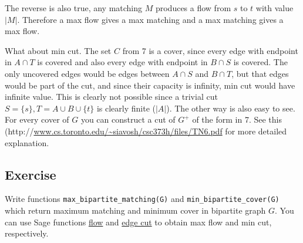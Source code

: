 The reverse is also true, any matching $M$ produces a flow from $s$ to $t$ with value $|M|$. Therefore a max flow gives a max matching and a max matching gives a max flow.

What about min cut. The set $C$ from 7 is a cover, since every edge with endpoint in $A \cap T$ is covered and also every edge with endpoint in $B \cap S$ is covered. The only uncovered edges would be edges between $A \cap S$ and $B \cap T$, but that edges would be part of the cut, and since their capacity is infinity, min cut would have infinite value. This is clearly not possible since a trivial cut $S = \{s\}, T = A \cup B \cup \{t\}$ is clearly finite ($|A|$). The other way is also easy to see. For every cover of $G$ you can construct a cut of $G^+$ of the form in 7. See this (http://\url{www.cs.toronto.edu/~siavosh/csc373h/files/TN6.pdf} for more detailed explanation.

\subsection{Exercise}

Write functions \verb`max_bipartite_matching(G)` and \verb`min_bipartite_cover(G)` which return maximum matching and minimum cover in bipartite graph $G$. You can use Sage functions \href{http://doc.sagemath.org/html/en/reference/graphs/sage/graphs/generic_graph.html#sage.graphs.generic_graph.GenericGraph.flow}{flow} and \href{http://doc.sagemath.org/html/en/reference/graphs/sage/graphs/generic_graph.html#sage.graphs.generic_graph.GenericGraph.edge_cut}{edge cut} to obtain max flow and min cut, respectively.

